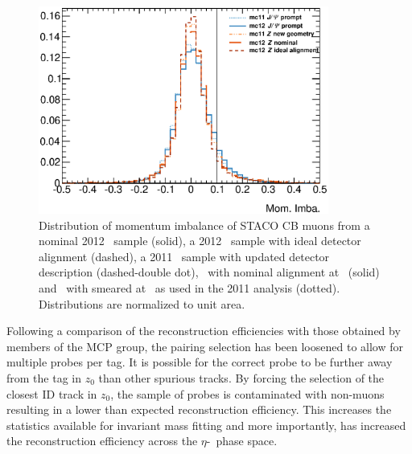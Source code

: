 \begin{figure}[htbp]
  \centering
    \includegraphics[width=0.85\textwidth]{PartCalibration2012/Plots/FixingMomImba/h_muon_momImba.eps}
    \caption{Distribution of momentum imbalance of STACO CB muons from a nominal 2012 \ZMu\ sample (solid), a 2012 \ZMu\ sample with ideal detector alignment (dashed), a 2011 \ZMu\ sample with updated detector description (dashed-double dot), \JMu\ with nominal alignment at \cmsE\ (solid) and \JMu\ with smeared at \cmsS\ as used in the 2011 analysis (dotted). Distributions are normalized to unit area.}\label{fig:CalibrationMomImba}
\end{figure}

Following a comparison of the reconstruction efficiencies with those obtained by members of the MCP group, the pairing selection has been loosened to allow for multiple probes per tag. It is possible for the correct probe to be further away from the tag in $z_0$ than other spurious tracks. By forcing the selection of the closest ID track in $z_0$, the sample of probes is contaminated with non-muons resulting in a lower than expected reconstruction efficiency. This increases the statistics available for invariant mass fitting and more importantly, has increased the reconstruction efficiency across the $\eta$-\pt\ phase space.
